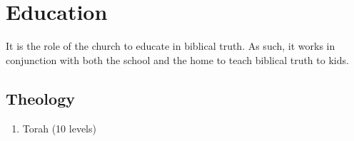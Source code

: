 \section{Education}

It is the role of the church to educate in biblical truth. As such, it works in conjunction with both the school and the home to teach biblical truth to kids.

\subsection{Theology}

\begin{enumerate}
\item Torah (10 levels)
\end{enumerate}
